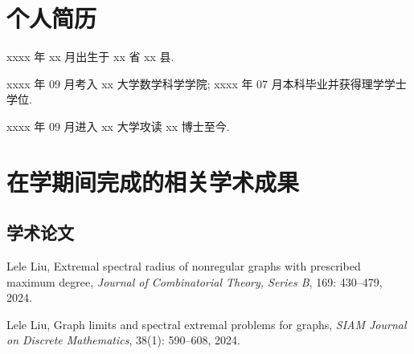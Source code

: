 
\begin{resume}

\section*{个人简历}

xxxx 年 xx 月出生于 xx 省 xx 县.

xxxx 年 09 月考入 xx 大学数学科学学院; xxxx 年 07 月本科毕业并获得理学学士学位.

xxxx 年 09 月进入 xx 大学攻读 xx 博士至今.


\section*{在学期间完成的相关学术成果}
\subsection*{学术论文}

\begin{achievements}
\item Lele Liu, Extremal spectral radius of nonregular graphs with prescribed maximum degree, 
\emph{Journal of Combinatorial Theory, Series B}, 169: 430--479, 2024.

\item Lele Liu, Graph limits and spectral extremal problems for graphs, 
\emph{SIAM Journal on Discrete Mathematics}, 38(1): 590--608, 2024.
\end{achievements}

\end{resume}
